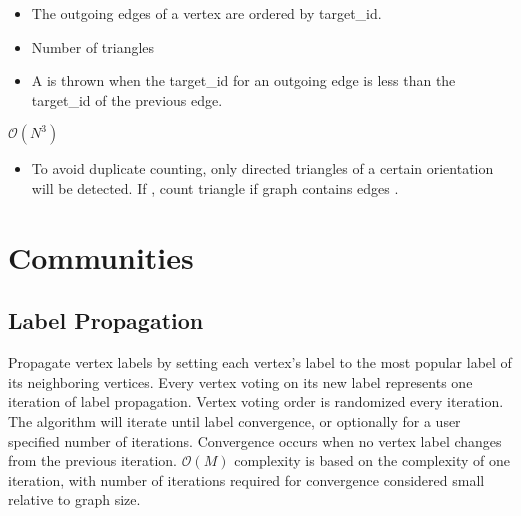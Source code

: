 {\small
      
}
\begin{itemdescr}
      \pnum\preconditions
            \begin{itemize}
                  \item The outgoing edges of a vertex are ordered by target\_id.
            \end{itemize}
      \pnum\returns 
            \begin{itemize}
                  \item Number of triangles
            \end{itemize}
      \pnum\throws
            \begin{itemize}
                  \item A  is thrown when the target\_id for an outgoing edge is less than the target\_id of the previous edge.
            \end{itemize}
      \pnum\complexity $\mathcal{O}(N^3)$ \\
      \pnum\remarks 
            \begin{itemize}
                  \item To avoid duplicate counting, only directed triangles of a certain orientation will be detected. 
                        If , count triangle if graph contains edges .
            \end{itemize}
\end{itemdescr}


\section{Communities}
\subsection{Label Propagation}
Propagate vertex labels by setting each vertex's label to the most popular label of its neighboring vertices. Every vertex voting on its new label represents one iteration of label propagation. Vertex voting order is randomized every iteration. The algorithm will iterate until label convergence, or optionally for a user specified number of iterations. Convergence occurs when no vertex label changes from the previous iteration. $\mathcal{O}(M)$ complexity is based on the complexity of one iteration, with number of iterations required for convergence considered small relative to graph size.

